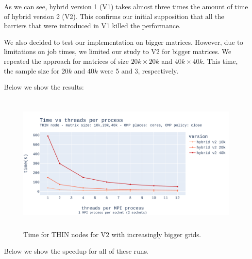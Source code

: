 \documentclass{report}
\begin{document}
As we can see, hybrid version 1 (V1) takes almost three times the amount of time of 
hybrid version 2 (V2). This confirms our initial supposition that all the barriers 
that were introduced in V1 killed the performance. 

We also decided to test our implementation on bigger matrices. However, due to 
limitations on job times, we limited our study to V2 for bigger matrices. 
We repeated the approach for matrices of size $20k\times 20k$ and $40k\times 40k$. 
This time, the sample size for $20k$ and $40k$ were 5 and 3, respectively.

Below we show the results: 

\begin{figure}[H]
\centering
\includegraphics[width=14cm, height=7cm]{./images/strong_OMP_thin_hybrid_v2.pdf}
\caption{\label{fig:strongompv2thin} Time for THIN nodes for V2 with increasingly
bigger grids.}
\end{figure}

Below we show the speedup for all of these runs.
\end{document}
